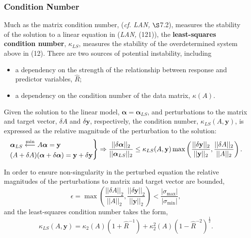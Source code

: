 \documentclass[12pt, twoside, draft]{article}
\begin{document}
\subsubsection{Condition Number}\label{sec:linear_model_condition_number}
Much as the matrix condition number, (\textit{cf. LAN,} $\S$7.2), measures the stability of the solution to a linear equation in (\textit{LAN,} (121)), the\textbf{ least-squares condition number}, $\kappa_{LS}$, measures the stability of the overdetermined system above in (12).  There are two sources of potential instability, including

\begin{itemize}[noitemsep]
\item a dependency on the strength of the relationship between response and predictor variables, $\hat{R}$;
\item a dependency on the condition number of the data matrix, $\kappa(A)$.
\end{itemize} 

Given the solution to the linear model, $\boldsymbol{\alpha} = \boldsymbol{\alpha}_{LS}$, and perturbations to the matrix and target vector, $\delta A$ and $\delta \mathbf{y}$, respectively, the condition number, $\kappa_{LS}(A, \mathbf{y})$, is expressed as the relative magnitude of the perturbation to the solution:
\begin{equation}\label{eq:perturbed_least_squares}
\begin{rcases}
\boldsymbol{\alpha}_{LS} \stackrel{\operatorname{min}}{\longleftarrow} A \boldsymbol{\alpha} = \mathbf{y} \\
(A + \delta A) (\boldsymbol{\alpha} + \delta \boldsymbol{\alpha}) = \mathbf{y} + \delta \mathbf{y}
\end{rcases} \Rightarrow
\frac{||\delta \boldsymbol{\alpha}||_2}{|| \boldsymbol{\alpha}_{LS} ||_2} \leq \kappa_{LS}(A, \mathbf{y}) \max\left( \frac{|| \delta \mathbf{y} ||_2}{|| \mathbf{y} ||_2}, \frac{|| \delta A ||_2}{|| A ||_2} \right).
\end{equation}

In order to ensure non-singularity in the perturbed equation the relative magnitudes of the perturbations to matrix and target vector are bounded,
\begin{equation}
\epsilon = \operatorname{max}\left( \frac{|| \delta A ||_2}{|| A ||_2}, \frac{|| \delta \mathbf{y} ||_2}{ || \mathbf{y} ||_2 }  \right) < \frac{| \sigma_{\operatorname{max}} |}{| \sigma_{\operatorname{min}} |},
\end{equation}
and the least-squares condition number takes the form,
\begin{equation}\label{eq:least_squares_condition_number}
\kappa_{LS}(A, \mathbf{y}) = \kappa_2(A) (1  + \hat{R}^{-1}) + \kappa^2_2(A)(1 - \hat{R}^{-2})^{\frac{1}{2}}.
\end{equation}
\end{document}
